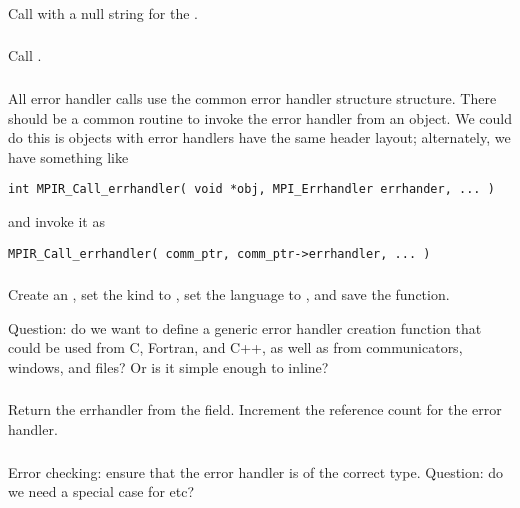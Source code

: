 \documentclass{article}
\begin{document}
\subsubsection{}
Call  with a null string for the
. 

\subsubsection{}
Call .

\subsubsection{}
All error handler calls use the common error handler structure
 structure.  There should be a common
routine to invoke the error handler from an object.  We could do this
is objects with error handlers have the same header layout;
alternately, we have something like
\begin{verbatim}
int MPIR_Call_errhandler( void *obj, MPI_Errhandler errhander, ... )
\end{verbatim}
and invoke it as
\begin{verbatim}
MPIR_Call_errhandler( comm_ptr, comm_ptr->errhandler, ... )
\end{verbatim}

\subsubsection{}
Create an , set the kind to
, set the language to , and
save the function.  

Question: do we want to define a generic error handler
creation function that could be used from C, Fortran, and C++, as well as from
communicators, windows, and files?  Or is it simple enough to inline?

\subsubsection{}
Return the errhandler from the  field.  Increment the 
reference count for the error handler.

\subsubsection{}
Error checking: ensure that the error handler is of the correct type.  
Question: do we need a special case for  etc?
\end{document}
